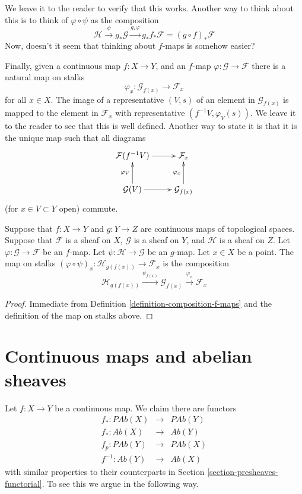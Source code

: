 \noindent
We leave it to the reader to verify that this works.
Another way to think about this is to think of
$\varphi \circ \psi$ as the composition
$$
\mathcal{H}
\xrightarrow{\psi}
g_*\mathcal{G}
\xrightarrow{g_*\varphi}
g_* f_* \mathcal{F} = (g \circ f)_* \mathcal{F}
$$
Now, doesn't it seem that thinking about $f$-maps is somehow
easier?

\medskip\noindent
Finally, given a continuous map $f : X \to Y$, and an
$f$-map $\varphi : \mathcal{G} \to \mathcal{F}$ there is
a natural map on stalks
$$
\varphi_x : \mathcal{G}_{f(x)} \longrightarrow \mathcal{F}_x
$$
for all $x \in X$. The image of a representative $(V, s)$
of an element in $\mathcal{G}_{f(x)}$ is mapped to the
element in $\mathcal{F}_x$ with representative $(f^{-1}V,
\varphi_V(s))$. We leave it to the reader to see that this
is well defined. Another way to state it is that it is the
unique map such that all diagrams
$$
\xymatrix{
\mathcal{F}(f^{-1}V) \ar[r] &
\mathcal{F}_{x} \\
\mathcal{G}(V) \ar[r] \ar[u]^{\varphi_V} &
\mathcal{G}_{f(x)} \ar[u]^{\varphi_x}
}
$$
(for $x \in V \subset Y$ open) commute.

\begin{lemma}
\label{lemma-compose-f-maps-stalks}
Suppose that $f : X \to Y$ and $g : Y \to Z$ are continuous
maps of topological spaces. Suppose that $\mathcal{F}$ is
a sheaf on $X$, $\mathcal{G}$ is a sheaf on $Y$, and
$\mathcal{H}$ is a sheaf on $Z$.
Let $\varphi : \mathcal{G} \to \mathcal{F}$ be an $f$-map.
Let $\psi : \mathcal{H} \to \mathcal{G}$ be an $g$-map.
Let $x \in X$ be a point. The map on stalks
$(\varphi \circ \psi)_x : \mathcal{H}_{g(f(x))}
\to \mathcal{F}_x$ is the composition
$$
\mathcal{H}_{g(f(x))}
\xrightarrow{\psi_{f(x)}}
\mathcal{G}_{f(x)}
\xrightarrow{\varphi_x}
\mathcal{F}_x
$$
\end{lemma}

\begin{proof}
Immediate from Definition \ref{definition-composition-f-maps}
and the definition of the map on stalks above.
\end{proof}



\section{Continuous maps and abelian sheaves}
\label{section-abelian-presheaves-functorial}

\noindent
Let $f : X \to Y$ be a continuous map.
We claim there are functors
\begin{eqnarray*}
f_* : \textit{PAb}(X) & \longrightarrow & \textit{PAb}(Y) \\
f_* : \textit{Ab}(X) & \longrightarrow & \textit{Ab}(Y) \\
f_p : \textit{PAb}(Y) & \longrightarrow & \textit{PAb}(X) \\
f^{-1} : \textit{Ab}(Y) & \longrightarrow & \textit{Ab}(X)
\end{eqnarray*}
with similar properties to their counterparts in
Section \ref{section-presheaves-functorial}.
To see this we argue in the following way.

